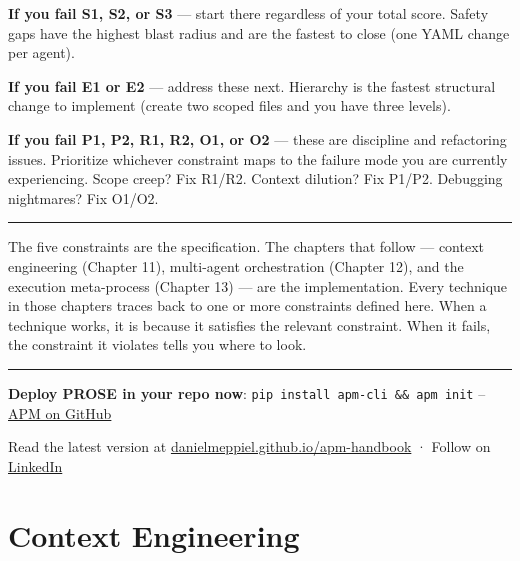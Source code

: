 \documentclass[
  a4paper,
  DIV=11,
  numbers=noendperiod]{scrreprt}
\begin{document}
\textbf{If you fail S1, S2, or S3} --- start there regardless of your
total score. Safety gaps have the highest blast radius and are the
fastest to close (one YAML change per agent).

\textbf{If you fail E1 or E2} --- address these next. Hierarchy is the
fastest structural change to implement (create two scoped files and you
have three levels).

\textbf{If you fail P1, P2, R1, R2, O1, or O2} --- these are discipline
and refactoring issues. Prioritize whichever constraint maps to the
failure mode you are currently experiencing. Scope creep? Fix R1/R2.
Context dilution? Fix P1/P2. Debugging nightmares? Fix O1/O2.

\begin{center}\rule{0.5\linewidth}{0.5pt}\end{center}

The five constraints are the specification. The chapters that follow ---
context engineering (Chapter 11), multi-agent orchestration (Chapter
12), and the execution meta-process (Chapter 13) --- are the
implementation. Every technique in those chapters traces back to one or
more constraints defined here. When a technique works, it is because it
satisfies the relevant constraint. When it fails, the constraint it
violates tells you where to look.

\begin{center}\rule{0.5\linewidth}{0.5pt}\end{center}

\begin{tcolorbox}[enhanced jigsaw, arc=.35mm, bottomrule=.15mm, breakable, colback=white, colframe=quarto-callout-tip-color-frame, left=2mm, leftrule=.75mm, opacityback=0, rightrule=.15mm, toprule=.15mm]

\textbf{Deploy PROSE in your repo now}:
\texttt{pip\ install\ apm-cli\ \&\&\ apm\ init} --
\href{https://github.com/microsoft/apm}{APM on GitHub}

Read the latest version at
\href{https://danielmeppiel.github.io/apm-handbook/}{danielmeppiel.github.io/apm-handbook}
· Follow on \href{https://www.linkedin.com/in/danielmeppiel/}{LinkedIn}

\end{tcolorbox}

\chapter{Context Engineering}\label{context-engineering}
\end{document}
